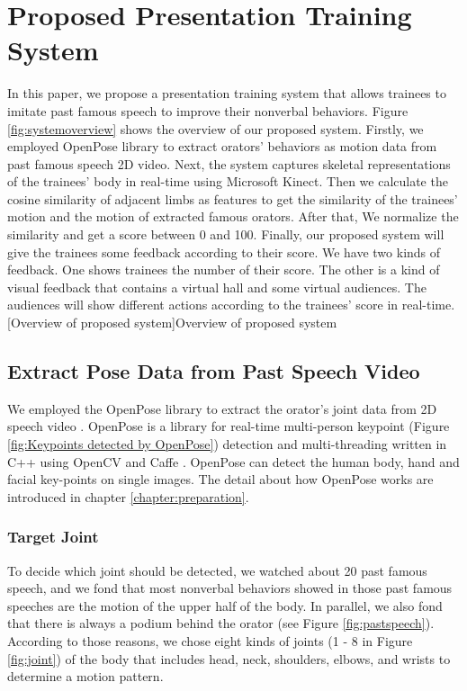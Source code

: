 \chapter{Proposed Presentation Training System}

\par In this paper, we propose a presentation training system that allows trainees to imitate past famous speech to improve their nonverbal behaviors. Figure \ref{fig:systemoverview} shows the overview of our proposed system. Firstly, we employed OpenPose library \cite{cao2017realtime} to extract orators' behaviors as motion data from past famous speech 2D video. Next, the system captures skeletal representations of the trainees' body in real-time using Microsoft Kinect. Then we calculate the cosine similarity of adjacent limbs as features to get the similarity of the trainees' motion and the motion of extracted famous orators. After that, We normalize the similarity and get a score between 0 and 100. Finally, our proposed system will give the trainees some feedback according to their score. We have two kinds of feedback. One shows trainees the number of their score. The other is a kind of visual feedback that contains a virtual hall and some virtual audiences. The audiences will show different actions according to the trainees' score in real-time. 
[Overview of proposed system]{Overview of proposed system}

\par\section{Extract Pose Data from Past Speech Video}

\par We employed the OpenPose library to extract the orator's joint data from 2D speech video \cite{cao2017realtime}. OpenPose is a library for real-time multi-person keypoint (Figure \ref{fig:Keypoints detected by OpenPose}) detection and multi-threading written in C++ using OpenCV and Caffe \cite{Jia2014}. OpenPose can detect the human body, hand and facial key-points on single images. The detail about how OpenPose works are introduced in chapter \ref{chapter:preparation}.

\subsection*{Target Joint}

\par To decide which joint should be detected, we watched about 20 past famous speech, and we fond that most nonverbal behaviors showed in those past famous speeches are the motion of the upper half of the body. In parallel, we also fond that there is always a podium behind the orator (see Figure \ref{fig:pastspeech}). According to those reasons, we chose eight kinds of joints (1 - 8 in Figure \ref{fig:joint}) of the body that includes head, neck, shoulders, elbows, and wrists to determine a motion pattern.


